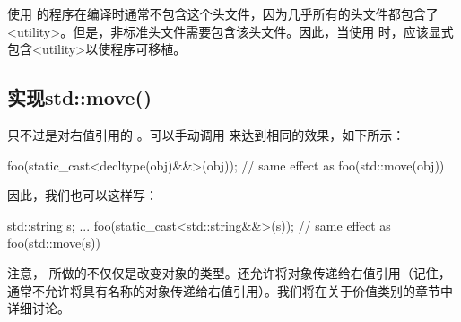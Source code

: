 使用  的程序在编译时通常不包含这个头文件，因为几乎所有的头文件都包含了<utility>。但是，非标准头文件需要包含该头文件。因此，当使用  时，应该显式包含<utility>以使程序可移植。

\subsection{实现std::move()}

 只不过是对右值引用的 。可以手动调用  来达到相同的效果，如下所示：

\begin{cppcode}
foo(static_cast<decltype(obj)&&>(obj)); // same effect as foo(std::move(obj))
\end{cppcode}

因此，我们也可以这样写：

\begin{cppcode}
std::string s;
...
foo(static_cast<std::string&&>(s)); // same effect as foo(std::move(s))
\end{cppcode}

注意， 所做的不仅仅是改变对象的类型。还允许将对象传递给右值引用（记住，通常不允许将具有名称的对象传递给右值引用）。我们将在关于价值类别的章节中详细讨论。





























